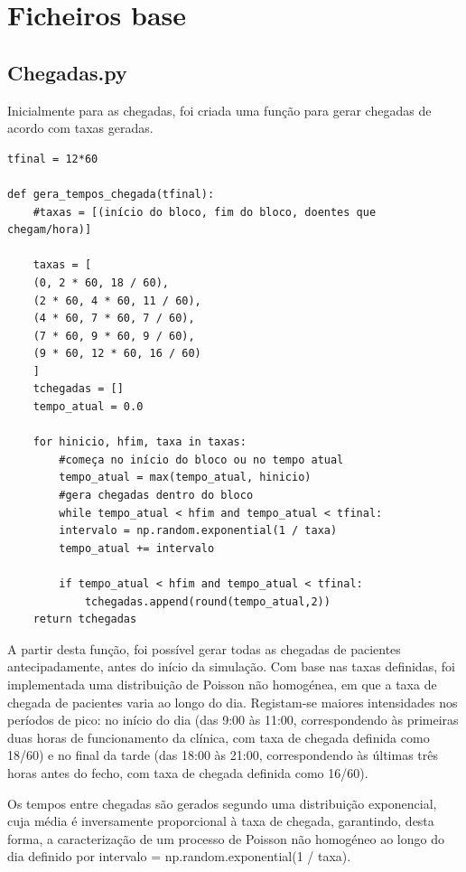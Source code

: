 \documentclass[12pt,a4paper]{article} %
\begin{document}
    \newpage

    \section{Ficheiros base}

    \subsection{Chegadas.py}
        Inicialmente para as chegadas, foi criada uma função para gerar chegadas de acordo com taxas geradas. 

\begin{verbatim}
tfinal = 12*60

def gera_tempos_chegada(tfinal):
    #taxas = [(início do bloco, fim do bloco, doentes que chegam/hora)]
                
    taxas = [
    (0, 2 * 60, 18 / 60),
    (2 * 60, 4 * 60, 11 / 60),
    (4 * 60, 7 * 60, 7 / 60),
    (7 * 60, 9 * 60, 9 / 60),
    (9 * 60, 12 * 60, 16 / 60)
    ]
    tchegadas = []
    tempo_atual = 0.0
                
    for hinicio, hfim, taxa in taxas:
        #começa no início do bloco ou no tempo atual
        tempo_atual = max(tempo_atual, hinicio)
        #gera chegadas dentro do bloco
        while tempo_atual < hfim and tempo_atual < tfinal:
        intervalo = np.random.exponential(1 / taxa)
        tempo_atual += intervalo
                
        if tempo_atual < hfim and tempo_atual < tfinal:
            tchegadas.append(round(tempo_atual,2))
    return tchegadas
\end{verbatim}

    A partir desta função, foi possível gerar todas as chegadas de pacientes antecipadamente, antes do início da simulação. Com base nas taxas definidas, foi implementada uma distribuição de Poisson não homogénea, em que a taxa de chegada de pacientes varia ao longo do dia. Registam-se maiores intensidades nos períodos de pico: no início do dia (das 9:00 às 11:00, correspondendo às primeiras duas horas de funcionamento da clínica, com taxa de chegada definida como 18/60) e no final da tarde (das 18:00 às 21:00, correspondendo às últimas três horas antes do fecho, com taxa de chegada definida como 16/60).

    \medskip
    Os tempos entre chegadas são gerados segundo uma distribuição exponencial, cuja média é inversamente proporcional à taxa de chegada, garantindo, desta forma, a caracterização de um processo de Poisson não homogéneo ao longo do dia definido por intervalo = np.random.exponential(1 / taxa).
\end{document}
